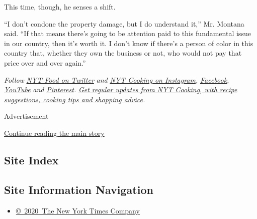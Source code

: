 This time, though, he senses a shift.

``I don't condone the property damage, but I do understand it,'' Mr.
Montana said. ``If that means there's going to be attention paid to this
fundamental issue in our country, then it's worth it. I don't know if
there's a person of color in this country that, whether they own the
business or not, who would not pay that price over and over again.''

\emph{Follow} \href{https://twitter.com/nytfood}{\emph{NYT Food on
Twitter}} \emph{and}
\href{https://www.instagram.com/nytcooking/}{\emph{NYT Cooking on
Instagram}}\emph{,}
\href{https://www.facebookcorewwwi.onion/nytcooking/}{\emph{Facebook}}\emph{,}
\href{https://www.youtube.com/nytcooking}{\emph{YouTube}} \emph{and}
\href{https://www.pinterest.com/nytcooking/}{\emph{Pinterest}}\emph{.}
\href{https://www.nytimes3xbfgragh.onion/newsletters/cooking}{\emph{Get
regular updates from NYT Cooking, with recipe suggestions, cooking tips
and shopping advice}}\emph{.}

Advertisement

\protect\hyperlink{after-bottom}{Continue reading the main story}

\hypertarget{site-index}{%
\subsection{Site Index}\label{site-index}}

\hypertarget{site-information-navigation}{%
\subsection{Site Information
Navigation}\label{site-information-navigation}}

\begin{itemize}
\tightlist
\item
  \href{https://help.nytimes3xbfgragh.onion/hc/en-us/articles/115014792127-Copyright-notice}{©~2020~The
  New York Times Company}
\end{itemize}


